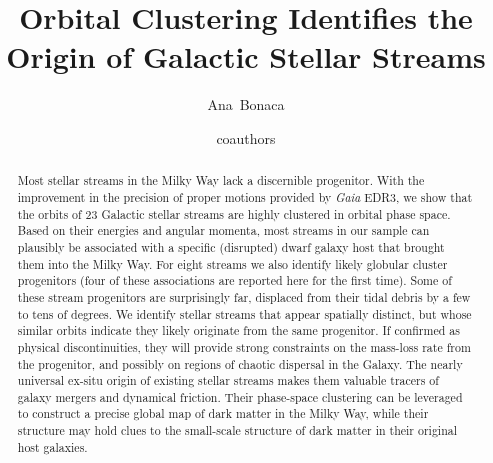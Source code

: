 \documentclass[twocolumn]{aastex63}
\begin{document}
\sloppy\sloppypar\raggedbottom\frenchspacing %

\title{Orbital Clustering Identifies the Origin of Galactic Stellar Streams}


\author[0000-0002-7846-9787]{Ana~Bonaca}

\author{coauthors}



\begin{abstract}\noindent %
Most stellar streams in the Milky Way lack a discernible progenitor.
With the improvement in the precision of proper motions provided by {\it Gaia} EDR3, we show that the orbits of 23 Galactic stellar streams are highly clustered in orbital phase space.
Based on their energies and angular momenta, most streams in our sample can plausibly be associated with a specific (disrupted) dwarf galaxy host that brought them into the Milky Way.
For eight streams we also identify likely globular cluster progenitors (four of these associations are reported here for the first time).
Some of these stream progenitors are surprisingly far, displaced from their tidal debris by a few to tens of degrees.
We identify stellar streams that appear spatially distinct, but whose similar orbits indicate they likely originate from the same progenitor.
If confirmed as physical discontinuities, they will provide strong constraints on the mass-loss rate from the progenitor, and possibly on regions of chaotic dispersal in the Galaxy.
The nearly universal ex-situ origin of existing stellar streams makes them valuable tracers of galaxy mergers and dynamical friction.
Their phase-space clustering can be leveraged to construct a precise global map of dark matter in the Milky Way, while their structure may hold clues to the small-scale structure of dark matter in their original host galaxies.
\end{abstract}
\end{document}
